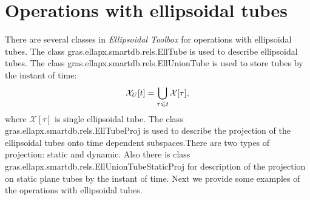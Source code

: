 \documentclass[letterpaper,10pt,english]{sphinxmanual}
\begin{document}
\section{Operations with ellipsoidal tubes}
\label{chap_implement:operations-with-ellipsoidal-tubes}
There are several classes in \emph{Ellipsoidal Toolbox} for operations with
ellipsoidal tubes. The class gras.ellapx.smartdb.rels.EllTube is used to
describe ellipsoidal tubes. The class
gras.ellapx.smartdb.rels.EllUnionTube is used to store tubes by the
instant of time:
\begin{gather}
\begin{split}{\mathcal X}_{U}[t]=\bigcup \limits_{\tau\leqslant t}{\mathcal X}[\tau],\end{split}\notag
\end{gather}
where \({\mathcal X}[\tau]\) is single ellipsoidal tube. The class
gras.ellapx.smartdb.rels.EllTubeProj is used to describe the projection
of the ellipsoidal tubes onto time dependent subspaces.There are two
types of projection: static and dynamic. Also there is class
gras.ellapx.smartdb.rels.EllUnionTubeStaticProj for description of the
projection on static plane tubes by the instant of time. Next we provide
some examples of the operations with ellipsoidal tubes.
\end{document}
